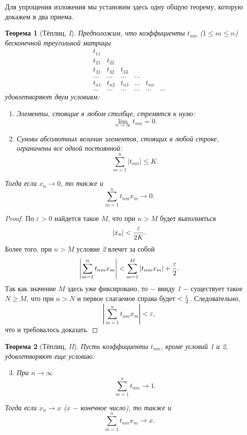 \documentclass{article}
\newtheorem{theorem}{Теорема}[section]
\begin{document}
Для упрощения изложения мы установим здесь одну общую теорему, которую докажем в два приема.

\begin{theorem}[Тёплиц, \textit{I}]
Предположим, что коэффициенты \(t_{nm}\) (\(1 \leq m \leq n\)) бесконечной треугольной матрицы
\[
\begin{matrix}
t_{11} \\
t_{21} & t_{22} \\
t_{31} & t_{32} & t_{33} \\
... & ... & ... & ... \\
t_{n1} & t_{n2} & t_{n3} & ... & t_{nn} \\
... & ... & ... & ... & ... & ...
\end{matrix}
\]
удовлетворяют двум условиям:

\begin{enumerate}
\item Элементы, стоящие в любом столбце, стремятся к нулю:
\[
\lim\limits_{n \to \infty} t_{nm} = 0.
\]
\item Суммы абсолютных величин элементов, стоящих в любой строке, ограничены все одной постоянной:
\[
\sum\limits_{m = 1}^{n} {|t_{nm}|} \leq K.
\]
\end{enumerate}
Тогда если \(x_n \to 0\), то также и
\[
\sum\limits_{m = 1}^{n} {t_{nm} x_m} \to 0.
\]
\end{theorem}

\begin{proof}
По \(\varepsilon > 0\) найдется такое \(M\), что при \(n > M\) будет выполняться
\[
|x_n| < {{\varepsilon} \over {2K}}.
\]
Более того, при \(n > M\) условие \textit{2} влечет за собой
\[
\left|\sum\limits_{m = 1}^{n} {t_{nm} x_m}\right| < \sum\limits_{m = 1}^{M} {|t_{nm} x_m|} + {{\varepsilon} \over {2}}.
\]
Так как значение \(M\) здесь уже фиксировано, то \(-\) ввиду \textit{1} \(-\) существует такое \(N \geq M\), что при \(n > N\) и первое слагаемое справа будет \(< {\varepsilon \over 2}\). Следовательно,
\[
\left|\sum\limits_{m = 1}^{n} {t_{nm} x_m}\right| < \varepsilon,
\]
что и требовалось доказать.
\end{proof}

\begin{theorem}[Тёплиц, \textit{II}]
Пусть коэффициенты \(t_{nm}\), кроме условий \textit{1} и \textit{2}, удовлетворяют еще условию:
\begin{enumerate}
\setcounter{enumi}{2}
\item При \(n \to \infty\)
\[
\sum\limits_{m = 1}^{n} {t_{nm}} \to 1.
\]
\end{enumerate}
Тогда если \(x_n \to x\) (\(x\) \(-\) конечное число), то также и
\[
\sum\limits_{m = 1}^{n} {t_{nm} x_m} \to x.
\]
\end{theorem}
\end{document}

